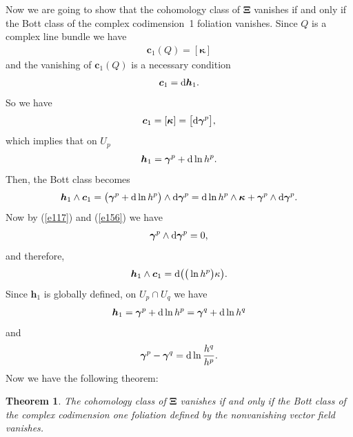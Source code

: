 \documentclass[10pt,a4paper]{amsart}
\numberwithin{equation}{section}
\newtheorem{Theorem}{Theorem}[section]
\begin{document}
Now we are going to show that the cohomology class of $\boldsymbol{\Xi }$ vanishes if and only if the Bott class of the complex codimension~1 foliation vanishes. Since $Q$ is a complex line bundle we have
\begin{gather*}
\boldsymbol{c}_{1}(Q) = [ \boldsymbol{\kappa } ]
\end{gather*}
and the vanishing of $\boldsymbol{c}_{1}(Q) $ is a necessary condition
\begin{gather*}
\boldsymbol{c}_{1}={\rm d}\boldsymbol{h}_{1}.
\end{gather*}
So we have
\begin{gather*}
\boldsymbol{c}_{1}= [ \boldsymbol{\kappa } ] =\big[ {\rm d}\boldsymbol{\gamma }^{p}\big],
\end{gather*}
which implies that on $U_{p}$
\begin{gather*}
\boldsymbol{h}_{1}=\boldsymbol{\gamma }^{p}+{\rm d}\ln h^{p}.
\end{gather*}
Then, the Bott class \cite{Bott} becomes
\begin{gather*}
\boldsymbol{h}_{1}\wedge \boldsymbol{c}_{1}=\big( \boldsymbol{\gamma }^{p}+{\rm d}\ln h^{p}\big) \wedge {\rm d}\boldsymbol{\gamma }^{p}={\rm d}\ln h^{p}\wedge \boldsymbol{\kappa }+\boldsymbol{\gamma }^{p}\wedge {\rm d}\boldsymbol{\gamma }^{p}.
\end{gather*}
Now by (\ref{e117}) and (\ref{e156}) we have
\begin{gather*}
\boldsymbol{\gamma }^{p}\wedge {\rm d}\boldsymbol{\gamma }^{p}=0,
\end{gather*}
and therefore,
\begin{gather*}
\boldsymbol{h}_{1}\wedge \boldsymbol{c}_{1}={\rm d}\big( \big( \ln h^{p}\big) \kappa\big).
\end{gather*}
Since $\boldsymbol{h}_{1}$ is globally def\/ined, on $U_{p}\cap U_{q}$ we have
\begin{gather*}
\boldsymbol{h}_{1}=\boldsymbol{\gamma }^{p}+{\rm d}\ln h^{p}=\boldsymbol{\gamma }^{q}+{\rm d}\ln h^{q}
\end{gather*}
and
\begin{gather}
\boldsymbol{\gamma }^{p}-\boldsymbol{\gamma }^{q}={\rm d}\ln \frac{h^{q}}{h^{p}}.
\label{e166}
\end{gather}
Now we have the following theorem:


\begin{Theorem}\label{theorem4}
The cohomology class of $\boldsymbol{\Xi }$ vanishes if and only if the Bott class of the complex codimension one foliation defined by the nonvanishing vector field vanishes.
\end{Theorem}
\end{document}
